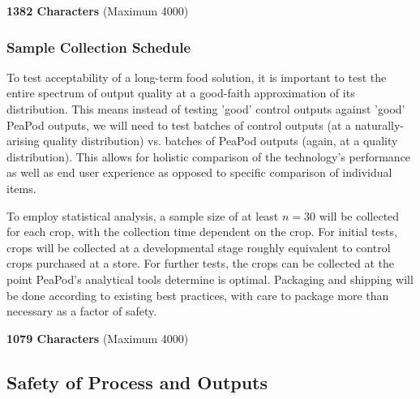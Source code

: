 \textbf{1382 Characters} (Maximum 4000)

\subsubsection{Sample Collection Schedule}


To test acceptability of a long-term food solution, it is important to test the entire spectrum of output quality at a good-faith approximation of its distribution. This means instead of testing 'good' control outputs against 'good' PeaPod outputs, we will need to test batches of control outputs (at a naturally-arising quality distribution) vs. batches of PeaPod outputs (again, at a quality distribution). This allows for holistic comparison of the technology's performance as well as end user experience as opposed to specific comparison of individual items.

To employ statistical analysis, a sample size of at least $n=30$ will be collected for each crop, with the collection time dependent on the crop. For initial tests, crops will be collected at a developmental stage roughly equivalent to control crops purchased at a store. For further tests, the crops can be collected at the point PeaPod's analytical tools determine is optimal. Packaging and shipping will be done according to existing best practices, with care to package more than necessary as a factor of safety. 

\textbf{1079 Characters} (Maximum 4000)

\clearpage

\subsection{Safety of Process and Outputs}


